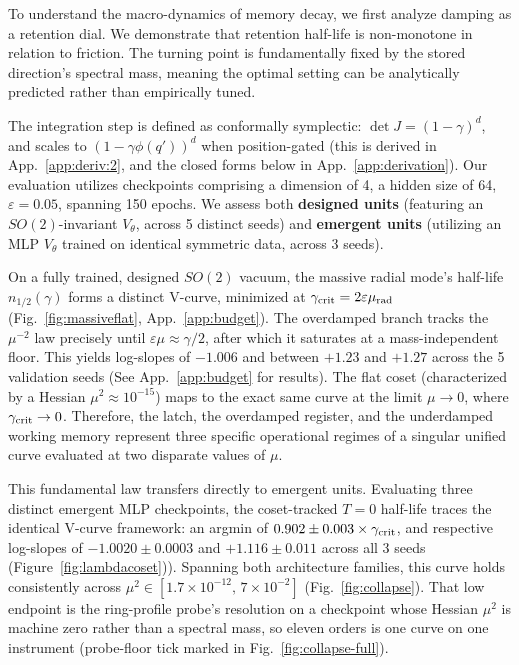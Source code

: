 \documentclass{article}
\begin{document}
To understand the macro-dynamics of memory decay, we first analyze damping as a retention dial. We demonstrate that retention half-life is non-monotone in relation to friction. The turning point is fundamentally fixed by the stored direction's spectral mass, meaning the optimal setting can be analytically predicted rather than empirically tuned.

The integration step is defined as conformally symplectic: $\det J=(1-\gamma)^d$, and scales to $(1-\gamma\phi(q'))^d$ when position-gated (this is derived in App.~\ref{app:deriv:2}, and the closed forms below in App.~\ref{app:derivation}). Our evaluation utilizes checkpoints comprising a dimension of 4, a hidden size of 64, $\varepsilon=0.05$, spanning 150 epochs. We assess both \textbf{designed units} (featuring an $SO(2)$-invariant $V_\theta$, across 5 distinct seeds) and \textbf{emergent units} (utilizing an MLP $V_\theta$ trained on identical symmetric data, across 3 seeds).

On a fully trained, designed $SO(2)$ vacuum, the massive radial mode's half-life $n_{1/2}(\gamma)$ forms a distinct V-curve, minimized at $\gamma_{\rm crit}=2\varepsilon\mu_{\rm rad}$ (Fig.~\ref{fig:massiveflat}, App.~\ref{app:budget}). The overdamped branch tracks the $\mu^{-2}$ law precisely until $\varepsilon\mu\approx\gamma/2$, after which it saturates at a mass-independent floor. This yields log-slopes of $-1.006$ and between $+1.23$ and $+1.27$ across the 5 validation seeds (See App.~\ref{app:budget} for results). The flat coset (characterized by a Hessian $\mu^2\approx10^{-15}$) maps to the exact same curve at the limit $\mu\to0$, where $\gamma_{\rm crit}\to0$. Therefore, the latch, the overdamped register, and the underdamped working memory represent three specific operational regimes of a singular unified curve evaluated at two disparate values of $\mu$.

This fundamental law transfers directly to emergent units. Evaluating three distinct emergent MLP checkpoints, the coset-tracked $T=0$ half-life traces the identical V-curve framework: an argmin of $0.902\pm0.003\times\gamma_{\rm crit}$, and respective log-slopes of $-1.0020\pm0.0003$ and $+1.116\pm0.011$ across all 3 seeds (Figure~\ref{fig:lambdacoset})). Spanning both architecture families, this curve holds consistently across $\mu^2\in[1.7\times10^{-12},\,7\times10^{-2}]$ (Fig.~\ref{fig:collapse}). That low endpoint is the ring-profile probe's resolution on a checkpoint whose Hessian $\mu^2$ is machine zero rather than a spectral mass, so eleven orders is one curve on one instrument (probe-floor tick marked in Fig.~\ref{fig:collapse-full}).
\end{document}
